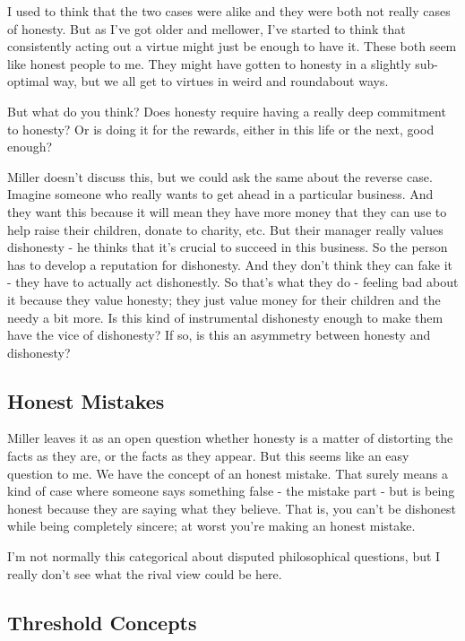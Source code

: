 \documentclass[
]{article}
\begin{document}
I used to think that the two cases were alike and they were both not
really cases of honesty. But as I've got older and mellower, I've
started to think that consistently acting out a virtue might just be
enough to have it. These both seem like honest people to me. They might
have gotten to honesty in a slightly sub-optimal way, but we all get to
virtues in weird and roundabout ways.

But what do you think? Does honesty require having a really deep
commitment to honesty? Or is doing it for the rewards, either in this
life or the next, good enough?

Miller doesn't discuss this, but we could ask the same about the reverse
case. Imagine someone who really wants to get ahead in a particular
business. And they want this because it will mean they have more money
that they can use to help raise their children, donate to charity, etc.
But their manager really values dishonesty - he thinks that it's crucial
to succeed in this business. So the person has to develop a reputation
for dishonesty. And they don't think they can fake it - they have to
actually act dishonestly. So that's what they do - feeling bad about it
because they value honesty; they just value money for their children and
the needy a bit more. Is this kind of instrumental dishonesty enough to
make them have the vice of dishonesty? If so, is this an asymmetry
between honesty and dishonesty?

\hypertarget{honest-mistakes}{%
\subsection{Honest Mistakes}\label{honest-mistakes}}

Miller leaves it as an open question whether honesty is a matter of
distorting the facts as they are, or the facts as they appear. But this
seems like an easy question to me. We have the concept of an honest
mistake. That surely means a kind of case where someone says something
false - the mistake part - but is being honest because they are saying
what they believe. That is, you can't be dishonest while being
completely sincere; at worst you're making an honest mistake.

I'm not normally this categorical about disputed philosophical
questions, but I really don't see what the rival view could be here.

\hypertarget{threshold-concepts}{%
\subsection{Threshold Concepts}\label{threshold-concepts}}
\end{document}
